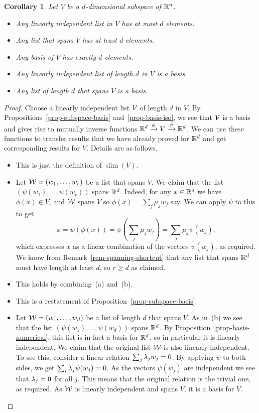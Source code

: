 \documentclass[reqno]{amsart}
\newtheorem{corollary}[theorem]{Corollary}
\theoremstyle{definition}
\begin{document}
\begin{corollary}\label{cor-basis-numerical}
 Let $V$ be a $d$-dimensional subspace of ${\mathbb{R}}^n$.
 \begin{itemize}
  \item[(a)] Any linearly independent list in $V$ has at most $d$ elements.
  \item[(b)] Any list that spans $V$ has at least $d$ elements.
  \item[(c)] Any basis of $V$ has exactly $d$ elements.
  \item[(d)] Any linearly independent list of length $d$ in $V$ is a basis.
  \item[(e)] Any list of length $d$ that spans $V$ is a basis.
 \end{itemize}
\end{corollary}
\begin{proof}
 Choose a linearly independent list $\mathcal{V}$ of length $d$ in $V$.  By
 Propositions~\ref{prop-subspace-basis} and~\ref{prop-basis-iso}, we
 see that $\mathcal{V}$ is a basis and gives rise to mutually inverse functions
 ${\mathbb{R}}^d\xrightarrow{\phi}V\xrightarrow{\psi}{\mathbb{R}}^d$.  We can use these functions to
 transfer results that we have already proved for ${\mathbb{R}}^d$ and get
 corresponding results for $V$.  Details are as follows.
 \begin{itemize}
  \item[(a)] This is just the definition of $\dim(V)$.
  \item[(b)] Let $\mathcal{W}=(w_1,\dotsc,w_r)$ be a list that spans $V$.  We
   claim that the list $(\psi(w_1),\dotsc,\psi(w_r))$ spans ${\mathbb{R}}^d$.
   Indeed, for any $x\in{\mathbb{R}}^d$ we have $\phi(x)\in V$, and $\mathcal{W}$ spans
   $V$ so $\phi(x)=\sum_j\mu_jw_j$ say.  We can apply $\psi$ to this
   to get
   \[ x = \psi(\phi(x)) = \psi(\sum_j\mu_jw_j)= \sum_j\mu_j\psi(w_j),
   \]
   which expresses $x$ as a linear combination of the vectors
   $\psi(w_j)$, as required.  We know from
   Remark~\ref{rem-spanning-shortcut} that any list that spans ${\mathbb{R}}^d$
   must have length at least $d$, so $r\geq d$ as claimed.
  \item[(c)] This holds by combining~(a) and~(b).
  \item[(d)] This is a restatement of
   Proposition~\ref{prop-subspace-basis}.
  \item[(e)] Let $\mathcal{W}=(w_1,\dotsc,w_d)$ be a list of length $d$ that
   spans $V$.  As in~(b) we see that the list
   $(\psi(w_1),\dotsc,\psi(w_d))$ spans ${\mathbb{R}}^d$.  By
   Proposition~\ref{prop-basis-numerical}, this list is in fact a
   basis for ${\mathbb{R}}^d$, so in particular it is linearly independent.  We
   claim that the original list $\mathcal{W}$ is also linearly independent.
   To see this, consider a linear relation $\sum_j\lambda_jw_j=0$.  By
   applying $\psi$ to both sides, we get $\sum_i\lambda_j\psi(w_j)=0$.  As
   the vectors $\psi(w_j)$ are independent we see that $\lambda_j=0$ for
   all $j$.  This means that the original relation is the trivial one,
   as required.  As $\mathcal{W}$ is linearly independent and spans $V$, it is
   a basis for $V$.
 \end{itemize}
\end{proof}
\end{document}
